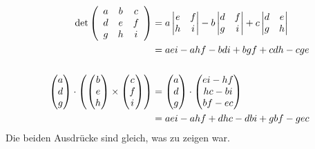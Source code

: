 \documentclass[a4paper,10pt]{extarticle}
\begin{document}
  \begin{align*}
  \det \left(\begin{array}{c c c}
    a & b & c \\
    d & e & f \\
    g & h & i \\
  \end{array}\right) &= a \begin{vmatrix} e & f \\ h & i \end{vmatrix} - b \begin{vmatrix} d & f \\ g & i \end{vmatrix} + c \begin{vmatrix} d & e \\ g & h\end{vmatrix} \\
  &= aei - ahf - bdi + bgf + cdh - cge \\ \\
  \begin{pmatrix} a \\ d \\ g \end{pmatrix} \cdot \begin{pmatrix} \begin{pmatrix} b \\ e \\ h \end{pmatrix} \times \begin{pmatrix} c \\ f \\ i \end{pmatrix} \end{pmatrix} &= \begin{pmatrix} a \\ d \\ g \end{pmatrix} \cdot \begin{pmatrix} ei - hf \\ hc - bi \\ bf - ec \end{pmatrix} \\
  &= aei - ahf + dhc - dbi + gbf - gec
  \end{align*}
  Die beiden Ausdrücke sind gleich, was zu zeigen war.
\end{document}
